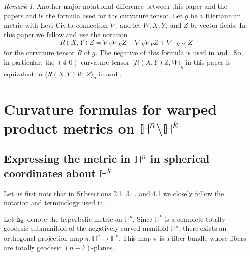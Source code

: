 \documentclass[10pt]{amsart}
\def\la{\langle}
\def\ra{\rangle}
\def\H{\mathbb{H}}
\theoremstyle{definition}
\theoremstyle{remark}
\newtheorem{remark}[theorem]{Remark}
\numberwithin{equation}{section}
\begin{document}
\begin{remark}\label{rmk:curvature notation}
Another major notational difference between this paper and the papers \cite{Belegradek complex} and \cite{Belegradek real} is the formula used for the curvature tensor.
Let $g$ be a Riemannian metric with Levi-Civita connection $\nabla$, and let $W, X, Y,$ and $Z$ be vector fields.  
In this paper we follow \cite{do Carmo} and use the notation
	\begin{equation}\label{eqn:curvature tensor notation}
	R(X,Y)Z = \nabla_Y \nabla_X Z - \nabla_X \nabla_Y Z + \nabla_{[X,Y]} Z
	\end{equation}
for the curvature tensor $R$ of $g$.  
The negative of this formula is used in \cite{Belegradek complex} and \cite{Belegradek real}.
So, in particular, the $(4,0)$-curvature tensor $\la R(X,Y)Z,W \ra_g$ in this paper is equivalent to $\la R(X,Y)W,Z \ra_g$ in \cite{Belegradek complex} and \cite{Belegradek real}.  
\end{remark}
























\vskip 20pt

\section{Curvature formulas for warped product metrics on $\H^n \setminus \H^k$}\label{section:hn/hk}

\subsection{Expressing the metric in $\H^n$ in spherical coordinates about $\H^k$}
Let us first note that in Subsections 2.1, 3.1, and 4.1 we closely follow the notation and terminology used in \cite{Belegradek complex}.

Let ${\bf h_n}$ denote the hyperbolic metric on $\H^n$.  
Since $\H^k$ is a complete totally geodesic submanifold of the negatively curved manifold $\H^n$, there exists an orthogonal projection map $\pi : \H^n \to \H^k$.  
This map $\pi$ is a fiber bundle whose fibers are totally geodesic $(n-k)$-planes.
\end{document}
